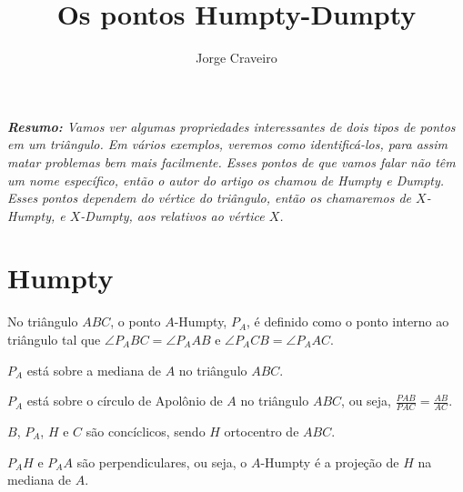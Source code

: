\documentclass[10pt, a4paper]{article}
\title{Os pontos Humpty-Dumpty}
\author{Jorge Craveiro}
\begin{document}
	
	\zeustitle
	\begin{center}
		\begin{minipage}{0.9\textwidth}
			\itshape \textcolor{sec1}{\bfseries Resumo:} Vamos ver algumas propriedades interessantes de dois tipos de pontos em um triângulo.
			Em vários exemplos, veremos como identificá-los, para assim matar problemas bem mais facilmente.
			Esses pontos de que vamos falar não têm um nome específico, então o autor do artigo os chamou de Humpty e Dumpty.
			Esses pontos dependem do vértice do triângulo, então os chamaremos de $X$-Humpty, e $X$-Dumpty, aos relativos ao vértice $X$.	
		\end{minipage}
	\end{center}
	
	\section{Humpty}
	\begin{defn}
		No triângulo $ABC$, o ponto $A$-Humpty, $P_A$, é definido como o ponto interno ao triângulo tal que $\angle P_ABC = \angle P_AAB$ e $\angle P_ACB = \angle P_AAC$.
	\end{defn}
	\begin{figure}[h]
		\centering
		\def\svgwidth{0.25\columnwidth}	
		
	\end{figure}
	\begin{prop}
		$P_A$ está sobre a mediana de $A$ no triângulo $ABC$.
	\end{prop}
	\begin{prop}
		$P_A$ está sobre o círculo de Apolônio de $A$ no triângulo $ABC$, ou seja, $\frac{PAB}{PAC} = \frac{AB}{AC}$.
	\end{prop}
	\begin{prop}
		$B$, $P_A$, $H$ e $C$ são concíclicos, sendo $H$ ortocentro de $ABC$.
	\end{prop}
	\begin{prop}
		$P_AH$ e $P_AA$ são perpendiculares, ou seja, o $A$-Humpty é a projeção de $H$ na mediana de $A$.
	\end{prop}
\end{document}
